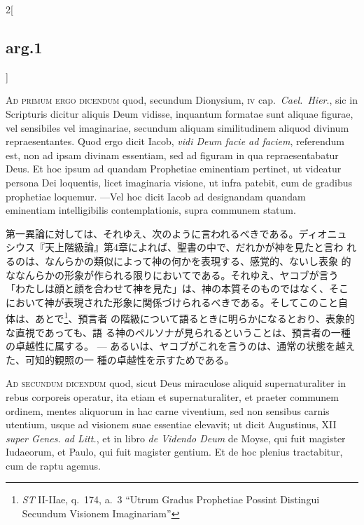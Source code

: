 \documentclass[paper=a4paper,fontsize=10pt,jafontsize=9pt,titlepage]{jlreq}
\begin{document}
\begin{paracol}{2}[\subsection{arg.1}]
\switchcolumn*[\subsection{ad.1}]

{\scshape Ad primum ergo dicendum} quod, secundum Dionysium, {\scshape iv}
cap.~{\itshape Cael.~Hier}., sic in Scripturis dicitur aliquis Deum
vidisse, inquantum formatae sunt aliquae figurae, vel sensibiles vel
imaginariae, secundum aliquam similitudinem aliquod divinum
repraesentantes. Quod ergo dicit Iacob, {\itshape vidi Deum facie ad
faciem}, referendum est, non ad ipsam divinam essentiam, sed ad
figuram in qua repraesentabatur Deus. Et hoc ipsum ad quandam
Prophetiae eminentiam pertinet, ut videatur persona Dei loquentis,
licet imaginaria visione, ut infra patebit, cum de gradibus prophetiae
loquemur. ---Vel hoc dicit Iacob ad designandam quandam eminentiam
intelligibilis contemplationis, supra communem statum.

\switchcolumn

第一異論に対しては、それゆえ、次のように言われるべきである。ディオニュ
シウス『天上階級論』第4章によれば、聖書の中で、だれかが神を見たと言わ
れるのは、なんらかの類似によって神の何かを表現する、感覚的、ないし表象
的ななんらかの形象が作られる限りにおいてである。それゆえ、ヤコブが言う
「わたしは顔と顔を合わせて神を見た」は、神の本質そのものではなく、そこ
において神が表現された形象に関係づけられるべきである。そしてこのこと自
体は、あとで\footnote{{\itshape ST} II-IIae, q.~174, a.~3 ``Utrum Gradus
Prophetiae Possint Distingui Secundum Visionem Imaginariam''}、預言者
の階級について語るときに明らかになるとおり、表象的な直視であっても、語
る神のペルソナが見られるということは、預言者の一種の卓越性に属する。
---
あるいは、ヤコブがこれを言うのは、通常の状態を越えた、可知的観照の一
 種の卓越性を示すためである。

\switchcolumn*[\subsection{ad.2}]

{\scshape Ad secundum dicendum} quod, sicut Deus miraculose aliquid
supernaturaliter in rebus corporeis operatur, ita etiam et
supernaturaliter, et praeter communem ordinem, mentes aliquorum in hac
carne viventium, sed non sensibus carnis utentium, usque ad visionem
suae essentiae elevavit; ut dicit Augustinus, XII {\itshape super Genes. ad
Litt.}, et in libro {\itshape de Videndo Deum} de Moyse, qui fuit magister
Iudaeorum, et Paulo, qui fuit magister gentium. Et de hoc plenius
tractabitur, cum de raptu agemus.


\end{paracol}
\end{document}
